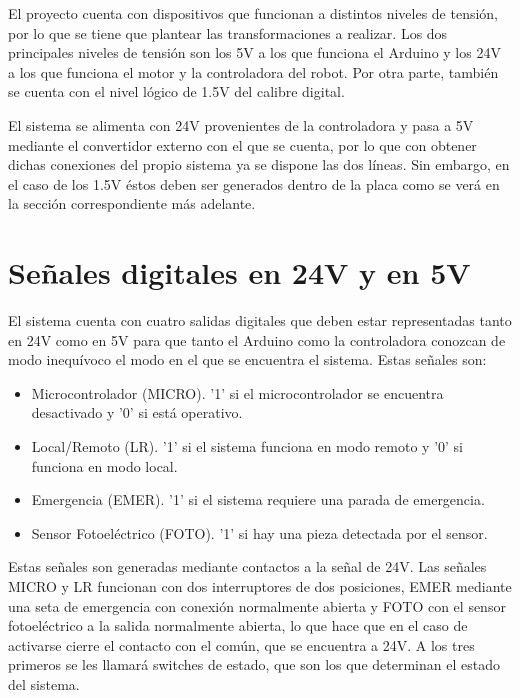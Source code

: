 El proyecto cuenta con dispositivos que funcionan a distintos niveles de tensión, por 
lo que se tiene que plantear las transformaciones a realizar. Los dos principales niveles de tensión 
son los 5V a los que funciona el Arduino y los 24V a los que funciona el motor y la controladora del 
robot. Por otra parte, también se cuenta con el nivel lógico de 1.5V del calibre digital.

El sistema se alimenta con 24V provenientes de la controladora y pasa a 5V mediante el convertidor
externo con el que se cuenta, por lo que con obtener dichas conexiones del propio sistema ya se dispone
las dos líneas. Sin embargo, en el caso de los 1.5V éstos deben ser generados dentro de la placa como
se verá en la sección correspondiente más adelante.

\section{Señales digitales en 24V y en 5V}

El sistema cuenta con cuatro salidas digitales que deben estar representadas tanto en 24V como en 5V
para que tanto el Arduino como la controladora conozcan de modo inequívoco el modo en el que se encuentra
el sistema. Estas señales son:
\begin{itemize}
    \item Microcontrolador (MICRO). '1' si el microcontrolador se encuentra desactivado y '0' si está operativo.
    \item Local/Remoto (LR). '1' si el sistema funciona en modo remoto y '0' si funciona en modo local.
    \item Emergencia (EMER). '1' si el sistema requiere una parada de emergencia.
    \item Sensor Fotoeléctrico (FOTO). '1' si hay una pieza detectada por el sensor.
\end{itemize}

Estas señales son generadas mediante contactos a la señal de 24V. Las señales MICRO y LR funcionan con dos
interruptores de dos posiciones, EMER mediante una seta de emergencia con conexión normalmente abierta y
FOTO con el sensor fotoeléctrico a la salida normalmente abierta, lo que hace que en el caso de activarse
cierre el contacto con el común, que se encuentra a 24V. A los tres primeros se les llamará switches de estado,
que son los que determinan el estado del sistema.


